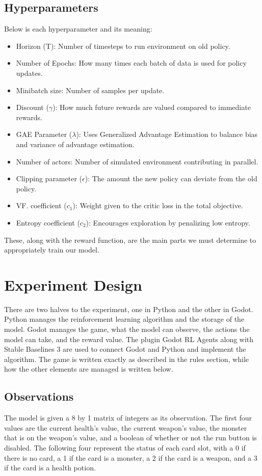 \documentclass{article}
\begin{document}
\subsection{Hyperparameters}
Below is each hyperparameter and its meaning:
\begin{itemize}
  \item Horizon (T): Number of timesteps to run environment on old policy.
  \item Number of Epochs: How many times each batch of data is used for policy updates.
  \item Minibatch size: Number of samples per update.
  \item Discount ($\gamma$): How much future rewards are valued compared to immediate rewards.
  \item GAE Parameter ($\lambda$): Uses Generalized Advantage Estimation to balance bias and variance of advantage estimation.
  \item Number of actors: Number of simulated environment contributing in parallel.
  \item Clipping parameter ($\epsilon$): The amount the new policy can deviate from the old policy.
  \item VF. coefficient ($c_1$): Weight given to the critic loss in the total objective.
  \item Entropy coefficient ($c_2$): Encourages exploration by penalizing low entropy.
\end{itemize}
These, along with the reward function, are the main parts we must determine to appropriately train our model.

\section{Experiment Design}
There are two halves to the experiment, one in Python and the other in Godot. Python manages the reinforcement learning algorithm and the storage of the model. Godot manages the game, what the model can observe, the actions the model can take, and the reward value. The plugin Godot RL Agents \cite{beeching_godot_nodate} along with Stable Baselines 3 \cite{stable-baselines3} are used to connect Godot and Python and implement the algorithm. The game is written exactly as described in the rules section, while how the other elements are managed is written below.

\subsection{Observations}
The model is given a 8 by 1 matrix of integers as its observation. The first four values are the current health's value, the current weapon's value, the monster that is on the weapon's value, and a boolean of whether or not the run button is disabled. The following four represent the status of each card slot, with a 0 if there is no card, a 1 if the card is a monster, a 2 if the card is a weapon, and a 3 if the card is a health potion.
\end{document}
